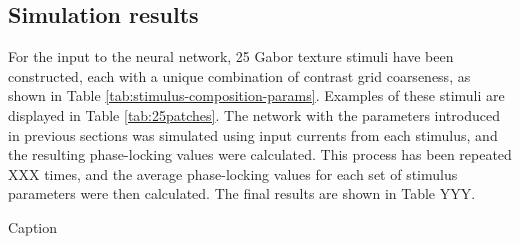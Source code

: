 \subsection{Simulation results}

For the input to the neural network, 25 Gabor texture stimuli have been constructed, each with a unique combination of contrast grid coarseness, as shown in Table \ref{tab:stimulus-composition-params}. Examples of these stimuli are displayed in Table \ref{tab:25patches}. The network with the parameters introduced in previous sections was simulated using input currents from each stimulus, and the resulting phase-locking values were calculated. This process has been repeated XXX times, and the average phase-locking values for each set of stimulus parameters were then calculated. The final results are shown in Table YYY.

\begin{table}[!hpt]
    \centering
    
    \caption{Caption}
    \label{tab:25patches}
\end{table}